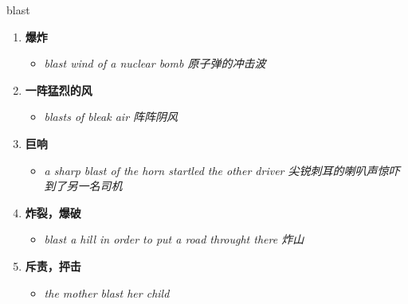 
\begin{frame}
{\huge blast}
\begin{center}
\begin{enumerate}\Large
  \item \textbf{爆炸}
  \begin{itemize}
    \item \em{\Large{blast wind of a nuclear bomb 原子弹的冲击波}}
  \end{itemize}
  \item \textbf{一阵猛烈的风}
  \begin{itemize}
    \item \em{\Large{blasts of bleak air 阵阵阴风}}
  \end{itemize}
  \item \textbf{巨响}
  \begin{itemize}
    \item \em{\Large{a sharp blast of the horn startled the other driver 尖锐刺耳的喇叭声惊吓到了另一名司机}}
  \end{itemize}
  \item \textbf{炸裂，爆破}
  \begin{itemize}
    \item \em{\Large{blast a hill in order to put a road throught there 炸山}}
  \end{itemize}
  \item \textbf{斥责，抨击}
  \begin{itemize}
    \item \em{\Large{the mother blast her child}}
  \end{itemize}
\end{enumerate}
\end{center}
\end{frame}

